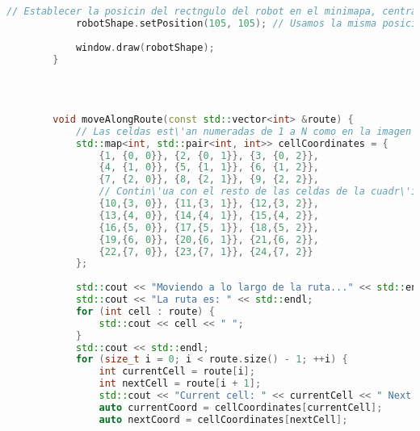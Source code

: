 \begin{lstlisting}[language={C++}, caption={Quinto ajuste de c\'odigo}, label={QuintoAjuste}]
            // Establecer la posicin del rectngulo del robot en el minimapa, centrado en la posicin del LiDAR
            robotShape.setPosition(105, 105); // Usamos la misma posicin del LiDAR para centrar el robot
        
            window.draw(robotShape);
        }
        
        
        
        
        void moveAlongRoute(const std::vector<int> &route) {
            // Las celdas est\'an numeradas de 1 a N como en la imagen proporcionada.
            std::map<int, std::pair<int, int>> cellCoordinates = {
                {1, {0, 0}}, {2, {0, 1}}, {3, {0, 2}},
                {4, {1, 0}}, {5, {1, 1}}, {6, {1, 2}},
                {7, {2, 0}}, {8, {2, 1}}, {9, {2, 2}},
                // Contin\'ua con el resto de las celdas de la cuadr\'icula...
                {10,{3, 0}}, {11,{3, 1}}, {12,{3, 2}},
                {13,{4, 0}}, {14,{4, 1}}, {15,{4, 2}},
                {16,{5, 0}}, {17,{5, 1}}, {18,{5, 2}},
                {19,{6, 0}}, {20,{6, 1}}, {21,{6, 2}},
                {22,{7, 0}}, {23,{7, 1}}, {24,{7, 2}}
            };
        
            std::cout << "Moviendo a lo largo de la ruta..." << std::endl;
            std::cout << "La ruta es: " << std::endl;
            for (int cell : route) {
                std::cout << cell << " ";
            }
            std::cout << std::endl;
            for (size_t i = 0; i < route.size() - 1; ++i) {
                int currentCell = route[i];
                int nextCell = route[i + 1];
                std::cout << "Current cell: " << currentCell << " Next cell: " << nextCell << endl;
                auto currentCoord = cellCoordinates[currentCell];
                auto nextCoord = cellCoordinates[nextCell];
        

\end{lstlisting}
